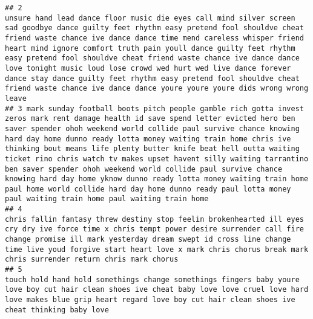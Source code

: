 \documentclass[]{article}
\begin{document}
\begin{verbatim}
## 2                                                                                                       unsure hand lead dance floor music die eyes call mind silver screen sad goodbye dance guilty feet rhythm easy pretend fool shouldve cheat friend waste chance ive dance dance time mend careless whisper friend heart mind ignore comfort truth pain youll dance guilty feet rhythm easy pretend fool shouldve cheat friend waste chance ive dance dance love tonight music loud lose crowd wed hurt wed live dance forever dance stay dance guilty feet rhythm easy pretend fool shouldve cheat friend waste chance ive dance dance youre youre youre dids wrong wrong leave
## 3 mark sunday football boots pitch people gamble rich gotta invest zeros mark rent damage health id save spend letter evicted hero ben saver spender ohoh weekend world collide paul survive chance knowing hard day home dunno ready lotta money waiting train home chris ive thinking bout means life plenty butter knife beat hell outta waiting ticket rino chris watch tv makes upset havent silly waiting tarrantino ben saver spender ohoh weekend world collide paul survive chance knowing hard day home yknow dunno ready lotta money waiting train home paul home world collide hard day home dunno ready paul lotta money paul waiting train home paul waiting train home
## 4                                                                                                                                                                                                                                                                                                                                                      chris fallin fantasy threw destiny stop feelin brokenhearted ill eyes cry dry ive force time x chris tempt power desire surrender call fire change promise ill mark yesterday dream swept id cross line change time live youd forgive start heart love x mark chris chorus break mark chris surrender return chris mark chorus
## 5                                                                                                                                                                                                                                                                                                                                                                                                                                            touch hold hand hold somethings change somethings fingers baby youre love boy cut hair clean shoes ive cheat baby love love cruel love hard love makes blue grip heart regard love boy cut hair clean shoes ive cheat thinking baby love

\end{verbatim}
\end{document}
